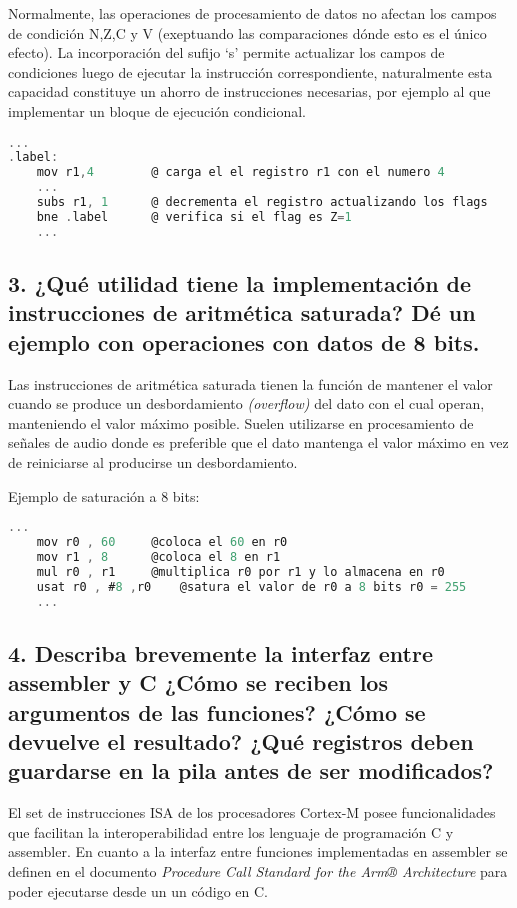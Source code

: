 \documentclass[10pt,a4paper,twoside,spanish]{article}	%
\begin{document}
Normalmente, las operaciones de procesamiento de datos no afectan los campos de condición N,Z,C y V  (exeptuando las comparaciones dónde esto es el único efecto). La incorporación del sufijo ‘s’ permite actualizar los campos de condiciones luego de ejecutar la instrucción correspondiente, naturalmente esta capacidad constituye un ahorro de instrucciones necesarias, por ejemplo al que implementar un bloque de ejecución condicional.

\begin{lstlisting}[language=C]
	...
.label:
	mov r1,4		@ carga el el registro r1 con el numero 4 
	...	
	subs r1, 1		@ decrementa el registro actualizando los flags			
	bne .label		@ verifica si el flag es Z=1
	...
\end{lstlisting}


\subsection*{3. ¿Qué utilidad tiene la implementación de instrucciones de aritmética saturada? Dé un ejemplo con operaciones con datos de 8 bits.}

Las instrucciones de aritmética saturada tienen la función de mantener el valor cuando se produce un desbordamiento \textit{(overflow)} del dato con el cual operan, manteniendo el valor máximo posible. Suelen utilizarse en procesamiento de señales de audio donde es preferible que el dato mantenga el valor máximo en vez de reiniciarse al producirse un desbordamiento.

Ejemplo de saturación a 8 bits:

\begin{lstlisting}[language=C]
	...
	mov r0 , 60		@coloca el 60 en r0 
	mov r1 , 8		@coloca el 8 en r1
	mul r0 , r1		@multiplica r0 por r1 y lo almacena en r0
	usat r0 , #8 ,r0	@satura el valor de r0 a 8 bits r0 = 255	
	...
\end{lstlisting}

\subsection*{4. Describa brevemente la interfaz entre assembler y C ¿Cómo se reciben los argumentos de las funciones? ¿Cómo se devuelve el resultado? ¿Qué registros deben guardarse en la pila antes de ser modificados?}

El set de instrucciones ISA de los procesadores Cortex-M posee funcionalidades que facilitan la 
interoperabilidad entre los lenguaje de programación C y assembler. En cuanto a la interfaz entre funciones implementadas en assembler se definen en el documento \textit{Procedure Call Standard for the Arm® Architecture} para poder ejecutarse desde un un código en C.
\end{document}
